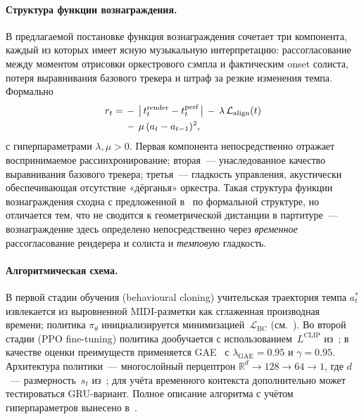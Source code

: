 \paragraph*{Структура функции вознаграждения.} В предлагаемой
постановке функция вознаграждения сочетает три компонента,
каждый из которых имеет ясную музыкальную интерпретацию:
рассогласование между моментом отрисовки оркестрового сэмпла и
фактическим onset солиста, потеря выравнивания базового
трекера и штраф за резкие изменения темпа. Формально
\begin{equation}
\begin{aligned}
r_t = \,&-\,\bigl|\,t^{\text{render}}_t - t^{\text{perf}}_t\,\bigr|
       \,-\, \lambda\,\mathcal{L}_{\text{align}}(t) \\
       &-\, \mu\,(a_t - a_{t-1})^2,
\end{aligned}
\eqlab{rl-reward-proposal}
\end{equation}
с гиперпараметрами $\lambda,\mu>0$. Первая компонента
непосредственно отражает воспринимаемое рассинхронирование;
вторая~--- унаследованное качество выравнивания базового
трекера; третья~--- гладкость управления, акустически
обеспечивающая отсутствие «дёрганья» оркестра. Такая структура
функции вознаграждения сходна с предложенной в~\cite{Dorfer2018RL}
по формальной структуре, но отличается тем, что не сводится к
геометрической дистанции в партитуре~---
вознаграждение здесь определено непосредственно через
\textit{временное} рассогласование рендерера и солиста и
\textit{темповую} гладкость.

\paragraph*{Алгоритмическая схема.} В первой стадии
обучения (behavioural cloning) учительская траектория темпа
$a^*_t$ извлекается из выровненной MIDI-разметки как сглаженная
производная времени; политика $\pi_\theta$ инициализируется
минимизацией~$\mathcal{L}_{\text{BC}}$ (см.\ ).
Во второй стадии (PPO fine-tuning) политика дообучается
с использованием~$L^{\text{CLIP}}$ из~; в
качестве оценки преимуществ применяется GAE~ с
$\lambda_{\text{GAE}}=0.95$ и $\gamma=0.95$. Архитектура
политики~--- многослойный перцептрон $\mathbb{R}^d \to 128 \to
64 \to 1$, где $d$~--- размерность~$s_t$ из~;
для учёта временного контекста дополнительно может тестироваться
GRU-вариант. Полное описание алгоритма с учётом гиперпараметров
вынесено в~.

